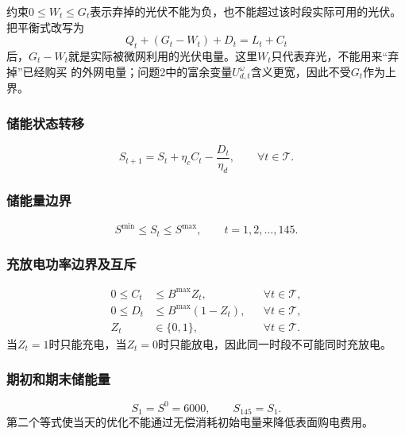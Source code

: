 \documentclass[UTF8,11pt]{ctexart}
\begin{document}
约束$0\leq W_t\leq G_t$表示弃掉的光伏不能为负，也不能超过该时段实际可用的光伏。
把平衡式改写为
\begin{equation}
    Q_t+(G_t-W_t)+D_t=L_t+C_t
\end{equation}
后，$G_t-W_t$就是实际被微网利用的光伏电量。这里$W_t$只代表弃光，不能用来“弃掉”已经购买
的外网电量；问题2中的富余变量$U^{\omega}_{d,t}$含义更宽，因此不受$G_t$作为上界。

\subsubsection{储能状态转移}

\begin{equation}
    S_{t+1}=S_t+\eta_c C_t-\frac{D_t}{\eta_d},
    \qquad \forall t\in\mathcal{T}.
    \label{eq:q1-soc}
\end{equation}

\subsubsection{储能量边界}

\begin{equation}
    S^{\min}\leq S_t\leq S^{\max},
    \qquad t=1,2,\ldots,145.
    \label{eq:q1-soc-bound}
\end{equation}

\subsubsection{充放电功率边界及互斥}

\begin{align}
    0\leq C_t&\leq B^{\max}Z_t,
    &&\forall t\in\mathcal{T}, \\
    0\leq D_t&\leq B^{\max}(1-Z_t),
    &&\forall t\in\mathcal{T}, \\
    Z_t&\in\{0,1\},
    &&\forall t\in\mathcal{T}.
    \label{eq:q1-mode}
\end{align}
当$Z_t=1$时只能充电，当$Z_t=0$时只能放电，因此同一时段不可能同时充放电。

\subsubsection{期初和期末储能量}

\begin{equation}
    S_1=S^0=6000,
    \qquad
    S_{145}=S_1.
    \label{eq:q1-terminal}
\end{equation}
第二个等式使当天的优化不能通过无偿消耗初始电量来降低表面购电费用。
\end{document}
